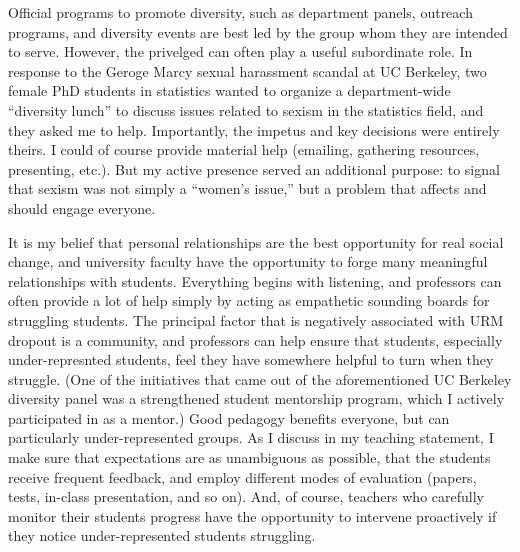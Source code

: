 Official programs to promote diversity, such as department panels, outreach
programs, and diversity events are best led by the group whom they are intended
to serve.  However, the privelged can often play a useful subordinate role.  In
response to the Geroge Marcy sexual harassment scandal at UC Berkeley, two
female PhD students in statistics wanted to organize a department-wide
``diversity lunch'' to discuss issues related to sexism in the statistics field,
and they asked me to help.  Importantly, the impetus and key decisions were
entirely theirs.  I could of course provide material help (emailing, gathering
resources, presenting, etc.). But my active presence served an additional
purpose: to signal that sexism was not simply a ``women's issue,'' but a problem
that affects and should engage everyone.

It is my belief that personal relationships are the best opportunity for real
social change, and university faculty have the opportunity to forge many
meaningful relationships with students.  Everything begins with listening, and
professors can often provide a lot of help simply by acting as empathetic
sounding boards for struggling students.  The principal factor that is
negatively associated with URM dropout is a community, and professors can help
ensure that students, especially under-represnted students, feel they have
somewhere helpful to turn when they struggle.  (One of the initiatives that came
out of the aforementioned UC Berkeley diversity panel was a strengthened student
mentorship program, which I actively participated in as a mentor.)  Good
pedagogy benefits everyone, but can particularly under-represented groups. As I
discuss in my teaching statement, I make sure that expectations are as
unambiguous as possible, that the students receive frequent feedback, and employ
different modes of evaluation (papers, tests, in-class presentation, and so on).
And, of course, teachers who carefully monitor their students progress have the
opportunity to intervene proactively if they notice under-represented students
struggling.




